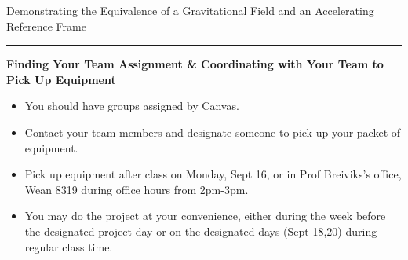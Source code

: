 \documentclass[12pt]{article}
\begin{document}
\vspace{1cm}
{\large{\noindent Demonstrating the Equivalence of a Gravitational Field and an
Accelerating Reference Frame}}

\noindent\rule{6.5in}{0.4pt}

\vspace{0.5cm}
{\bf{\noindent Finding Your Team Assignment \& Coordinating with Your Team to
Pick Up Equipment}}
\begin{itemize}
    \item You should have groups assigned by Canvas.
    \item Contact your team members and designate someone to pick up your packet
    of equipment.
    \item Pick up equipment after class on Monday, Sept 16, or in Prof
    Breiviks's office, Wean 8319 during office hours from 2pm-3pm.
    \item You may do the project at your convenience, either during the week
    before the designated project day or on the designated days (Sept 18,20)
    during regular class time.
\end{itemize}
\end{document}
